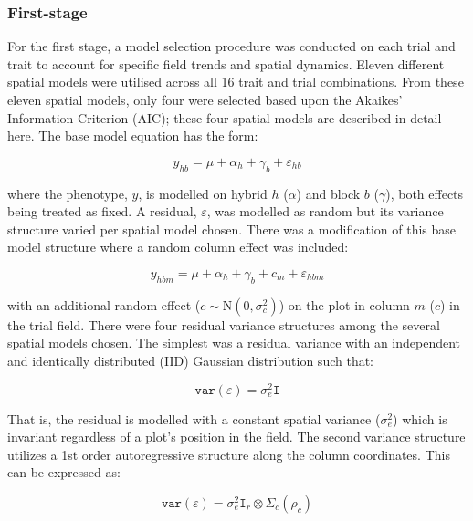 \subsubsection{First-stage}

For the first stage, a model selection procedure was conducted on each trial and trait to account for specific field trends and spatial dynamics. Eleven different spatial models were utilised across all 16 trait and trial combinations. From these eleven spatial models, only four were selected based upon the Akaikes' Information Criterion (AIC); these four spatial models are described in detail here. The base model equation has the form:

\begin{equation}
y_{hb} = \mu +  \alpha_h +\gamma_b  + \varepsilon_{hb}
\label{eq:base-spatial-model}
\end{equation}

where the phenotype, \(y\), is modelled on hybrid \(h\) (\(\alpha\)) and block \(b\) (\(\gamma\)), both effects being treated as fixed. A residual, \(\varepsilon\), was modelled as random but its variance structure varied per spatial model chosen. There was a modification of this base model structure where a random column effect was included:

\begin{equation}
y_{hbm} = \mu +  \alpha_h +\gamma_b  +c_m + \varepsilon_{hbm}
\label{eq:base-spatial-model}
\end{equation}

with an additional random effect (\(c \sim \mathrm{N}(0,\sigma_c^2)\)) on the plot in column \(m\) (\(c\)) in the trial field.  There were four residual variance structures among the several spatial models chosen. The simplest was a residual variance with an independent and identically distributed (IID) Gaussian distribution such that:

\begin{equation}
\mathtt{var}(\varepsilon) = \sigma^2_e \mathtt I
\label{eq:iid-model}
\end{equation}

That is, the residual is modelled with a constant spatial variance (\(\sigma^2_e\)) which is invariant regardless of a plot's position in the field. The second variance structure utilizes a 1st order autoregressive structure along the column coordinates. This can be expressed as:

\begin{equation}
\mathtt{var}(\varepsilon) = \sigma^2_e \mathtt I_r\otimes\Sigma_c(\rho_c)  \label{eq:id-ar1-model}
\end{equation}

